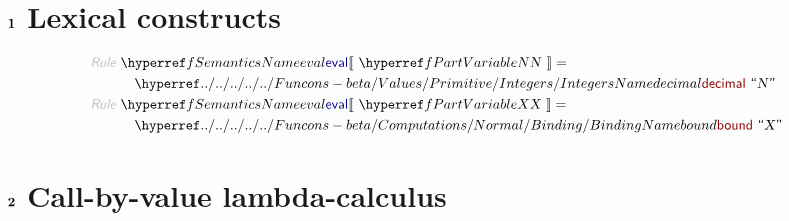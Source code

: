 \section*{$\SECT{1}$ Lexical constructs}\hypertarget{sect1-lexical-constructs}{}\label{sect1-lexical-constructs}

\begin{align*}
  \KEY{Rule} ~ 
    & \SEMREF{eval} \LEFTPHRASE ~ \VARREF{N} ~ \RIGHTPHRASE  = \\&\quad
      \NAMEHYPER{../../../../../Funcons-beta/Values/Primitive}{Integers}{decimal} ~
        \textsf{\textquotedblleft}\VAR{N}\textsf{\textquotedblright}
\\
  \KEY{Rule} ~ 
    & \SEMREF{eval} \LEFTPHRASE ~ \VARREF{X} ~ \RIGHTPHRASE  = \\&\quad
      \NAMEHYPER{../../../../../Funcons-beta/Computations/Normal}{Binding}{bound} ~
        \textsf{\textquotedblleft}\VAR{X}\textsf{\textquotedblright}
\end{align*}
\section*{$\SECT{2}$ Call-by-value lambda-calculus}\hypertarget{sect2-call-by-value-lambda-calculus}{}\label{sect2-call-by-value-lambda-calculus}

